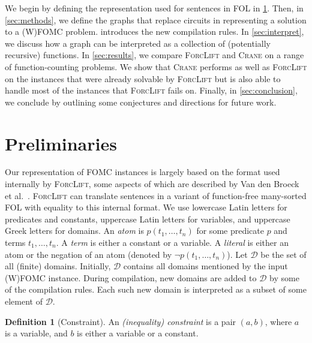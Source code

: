 \documentclass{article}
\theoremstyle{definition}
\newtheorem{definition}{Definition}
\begin{document}

We begin by defining the representation used for sentences in FOL in
\cref{sec:recprelims}. Then, in \cref{sec:methods}, we define the graphs that
replace circuits in representing a solution to a (W)FOMC problem.
 introduces the new compilation rules. In \cref{sec:interpret},
we discuss how a graph can be interpreted as a collection of (potentially
recursive) functions. In \cref{sec:results}, we compare \textsc{ForcLift} and
\textsc{Crane} on a range of function-counting problems. We show that
\textsc{Crane} performs as well as \textsc{ForcLift} on the instances that were
already solvable by \textsc{ForcLift} but is also able to handle most of the
instances that \textsc{ForcLift} fails on. Finally, in \cref{sec:conclusion}, we
conclude by outlining some conjectures and directions for future work.

\section{Preliminaries}\label{sec:recprelims}

Our representation of FOMC instances is largely based on the format used
internally by \textsc{ForcLift}, some aspects of which are described by Van den
Broeck et al.~. \textsc{ForcLift} can
translate sentences in a variant of function-free many-sorted FOL with equality
to this internal format. We use lowercase Latin letters for predicates and
constants, uppercase Latin letters for variables, and uppercase Greek letters
for domains. An \emph{atom} is $p(t_1, \dots, t_n)$ for some predicate $p$ and
terms $t_{1}, \dots, t_{n}$. A \emph{term} is either a constant or a variable. A
\emph{literal} is either an atom or the negation of an atom (denoted by
$\neg p(t_1, \dots, t_n)$). Let $\mathcal{D}$ be the set of all (finite)
domains. Initially, $\mathcal{D}$ contains all domains mentioned by the input
(W)FOMC instance. During compilation, new domains are added to $\mathcal{D}$ by
some of the compilation rules. Each such new domain is interpreted as a subset
of some element of $\mathcal{D}$.

\begin{definition}[Constraint]\label{def:constraint}
  An \emph{(inequality) constraint} is a pair $(a, b)$, where $a$ is a variable,
  and $b$ is either a variable or a constant.
\end{definition}
\end{document}

